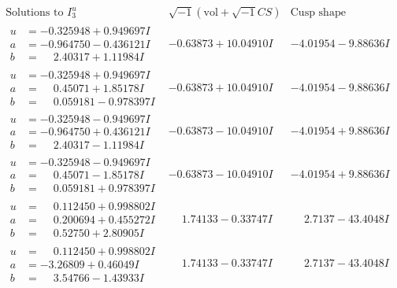 \documentclass[1p]{elsarticle_modified}
\theoremstyle{definition}
\newcommand{\I}{\sqrt{-1}}
\begin{document}
$$\begin{array}{c|c|c}  
\text{Solutions to }I^u_{3}& \I (\text{vol} + \sqrt{-1}CS) & \text{Cusp shape}\\
 \hline 
\begin{aligned}
u &= -0.325948 + 0.949697 I \\
a &= -0.964750 - 0.436121 I \\
b &= \phantom{-}2.40317 + 1.11984 I\end{aligned}
 & -0.63873 + 10.04910 I & -4.01954 - 9.88636 I \\ \hline\begin{aligned}
u &= -0.325948 + 0.949697 I \\
a &= \phantom{-}0.45071 + 1.85178 I \\
b &= \phantom{-}0.059181 - 0.978397 I\end{aligned}
 & -0.63873 + 10.04910 I & -4.01954 - 9.88636 I \\ \hline\begin{aligned}
u &= -0.325948 - 0.949697 I \\
a &= -0.964750 + 0.436121 I \\
b &= \phantom{-}2.40317 - 1.11984 I\end{aligned}
 & -0.63873 - 10.04910 I & -4.01954 + 9.88636 I \\ \hline\begin{aligned}
u &= -0.325948 - 0.949697 I \\
a &= \phantom{-}0.45071 - 1.85178 I \\
b &= \phantom{-}0.059181 + 0.978397 I\end{aligned}
 & -0.63873 - 10.04910 I & -4.01954 + 9.88636 I \\ \hline\begin{aligned}
u &= \phantom{-}0.112450 + 0.998802 I \\
a &= \phantom{-}0.200694 + 0.455272 I \\
b &= \phantom{-}0.52750 + 2.80905 I\end{aligned}
 & \phantom{-}1.74133 - 0.33747 I & \phantom{-}2.7137 - 43.4048 I \\ \hline\begin{aligned}
u &= \phantom{-}0.112450 + 0.998802 I \\
a &= -3.26809 + 0.46049 I \\
b &= \phantom{-}3.54766 - 1.43933 I\end{aligned}
 & \phantom{-}1.74133 - 0.33747 I & \phantom{-}2.7137 - 43.4048 I \\ \hline\begin{aligned}

\end{aligned}
\end{array}$$
\end{document}
